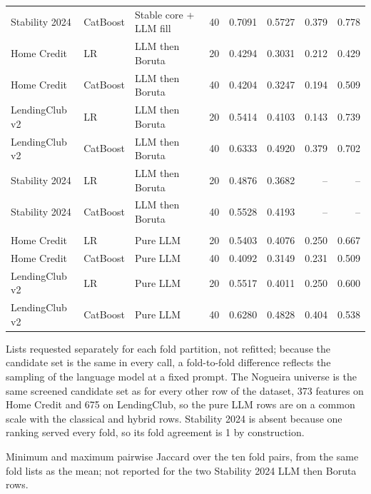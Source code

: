 \documentclass[final,5p,twocolumn]{elsarticle}
\begin{document}
\begin{table}[htbp]
\begin{threeparttable}
\begin{tabular}{@{}lllcrrrr@{}}
Stability 2024 & CatBoost & Stable core + LLM fill & 40 & 0.7091 & 0.5727 & 0.379 & 0.778 \\
Home Credit & LR & LLM then Boruta & 20 & 0.4294 & 0.3031 & 0.212 & 0.429 \\
Home Credit & CatBoost & LLM then Boruta & 40 & 0.4204 & 0.3247 & 0.194 & 0.509 \\
LendingClub v2 & LR & LLM then Boruta & 20 & 0.5414 & 0.4103 & 0.143 & 0.739 \\
LendingClub v2 & CatBoost & LLM then Boruta & 40 & 0.6333 & 0.4920 & 0.379 & 0.702 \\
Stability 2024 & LR & LLM then Boruta & 20 & 0.4876 & 0.3682 & -- & -- \\
Stability 2024 & CatBoost & LLM then Boruta & 40 & 0.5528 & 0.4193 & -- & -- \\
\addlinespace
\multicolumn{8}{@{}l}{\emph{Pure LLM, cached per-fold lists ($d$ = the candidate set: 373 and 675)}\tnote{a}} \\
Home Credit & LR & Pure LLM & 20 & 0.5403 & 0.4076 & 0.250 & 0.667 \\
Home Credit & CatBoost & Pure LLM & 40 & 0.4092 & 0.3149 & 0.231 & 0.509 \\
LendingClub v2 & LR & Pure LLM & 20 & 0.5517 & 0.4011 & 0.250 & 0.600 \\
LendingClub v2 & CatBoost & Pure LLM & 40 & 0.6280 & 0.4828 & 0.404 & 0.538 \\
\bottomrule
\end{tabular}
\begin{tablenotes}\footnotesize
\item[a] Lists requested separately for each fold partition, not refitted; because the candidate set is the same in every call, a fold-to-fold difference reflects the sampling of the language model at a fixed prompt. The Nogueira universe is the same screened candidate set as for every other row of the dataset, 373 features on Home Credit and 675 on LendingClub, so the pure LLM rows are on a common scale with the classical and hybrid rows. Stability 2024 is absent because one ranking served every fold, so its fold agreement is 1 by construction.
\item[b] Minimum and maximum pairwise Jaccard over the ten fold pairs, from the same fold lists as the mean; not reported for the two Stability 2024 LLM then Boruta rows.
\end{tablenotes}
\end{threeparttable}
\end{table}
\end{document}
